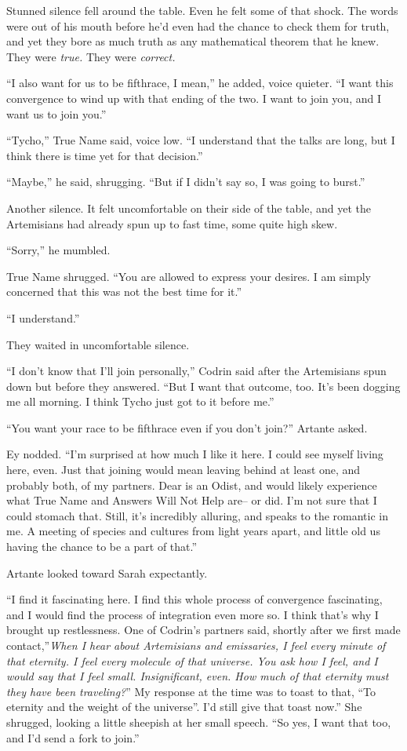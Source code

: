 Stunned silence fell around the table. Even he felt some of that shock. The words were out of his mouth before he'd even had the chance to check them for truth, and yet they bore as much truth as any mathematical theorem that he knew. They were \emph{true.} They were \emph{correct.}

``I also want for us to be fifthrace, I mean,'' he added, voice quieter. ``I want this convergence to wind up with that ending of the two. I want to join you, and I want us to join you.''

``Tycho,'' True Name said, voice low. ``I understand that the talks are long, but I think there is time yet for that decision.''

``Maybe,'' he said, shrugging. ``But if I didn't say so, I was going to burst.''

Another silence. It felt uncomfortable on their side of the table, and yet the Artemisians had already spun up to fast time, some quite high skew.

``Sorry,'' he mumbled.

True Name shrugged. ``You are allowed to express your desires. I am simply concerned that this was not the best time for it.''

``I understand.''

They waited in uncomfortable silence.

``I don't know that I'll join personally,'' Codrin said after the Artemisians spun down but before they answered. ``But I want that outcome, too. It's been dogging me all morning. I think Tycho just got to it before me.''

``You want your race to be fifthrace even if you don't join?'' Artante asked.

Ey nodded. ``I'm surprised at how much I like it here. I could see myself living here, even. Just that joining would mean leaving behind at least one, and probably both, of my partners. Dear is an Odist, and would likely experience what True Name and Answers Will Not Help are-- or did. I'm not sure that I could stomach that. Still, it's incredibly alluring, and speaks to the romantic in me. A meeting of species and cultures from light years apart, and little old us having the chance to be a part of that.''

Artante looked toward Sarah expectantly.

``I find it fascinating here. I find this whole process of convergence fascinating, and I would find the process of integration even more so. I think that's why I brought up restlessness. One of Codrin's partners said, shortly after we first made contact,''\emph{When I hear about Artemisians and emissaries, I feel every minute of that eternity. I feel every molecule of that universe. You ask how I feel, and I would say that I feel small. Insignificant, even. How much of that eternity must they have been traveling?}'' My response at the time was to toast to that, ``To eternity and the weight of the universe''. I'd still give that toast now.'' She shrugged, looking a little sheepish at her small speech. ``So yes, I want that too, and I'd send a fork to join.''

